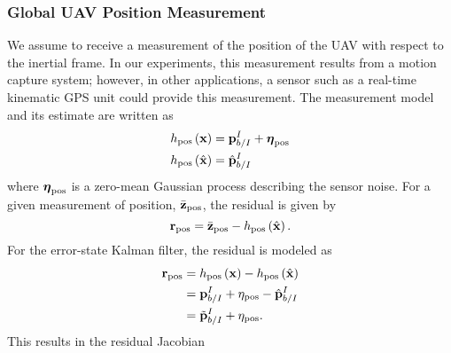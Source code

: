 \subsubsection{Global UAV Position Measurement}
We assume to receive a measurement of the position of the UAV with respect to
the inertial frame.
In our experiments, this measurement results from a motion capture system;
however, in other applications,
a sensor such as a real-time kinematic GPS unit could provide this measurement.
The measurement model and its estimate are
written as
\begin{align}
  h_{\text{pos}} \left( \boldsymbol{\mathrm{x}} \right) &= \boldsymbol{\mathrm{p}}_{b/I}^I +
  \boldsymbol{\mathrm{\eta}}_{\text{pos}} \\
  h_{\text{pos}} \left( \hat{\boldsymbol{\mathrm{x}}} \right) &= \hat{\boldsymbol{\mathrm{p}}}_{b/I}^I
\end{align}
where $\boldsymbol{\mathrm{\eta}}_{\text{pos}}$ is a zero-mean Gaussian process
describing the sensor noise.
For a given measurement of position, $\bar{\boldsymbol{\mathrm{z}}}_{\text{pos}}$, the residual is
given by
\begin{equation}
  \boldsymbol{\mathrm{r}}_{\text{pos}} = \bar{\boldsymbol{\mathrm{z}}}_{\text{pos}} - h_{\text{pos}} \left( \hat{\boldsymbol{\mathrm{x}}}
  \right).
\end{equation}
For the error-state Kalman filter, the residual is modeled as
\begin{align}
  \boldsymbol{\mathrm{r}}_{\text{pos}} &=  h_{\text{pos}} \left( \boldsymbol{\mathrm{x}} \right) - h_{\text{pos}} \left( \hat{\boldsymbol{\mathrm{x}}}
  \right) \\
                        &= \boldsymbol{\mathrm{p}}_{b/I}^I + \eta_{\text{pos}} -
                        \hat{\boldsymbol{\mathrm{p}}}_{b/I}^I \\
                        &= \tilde{\boldsymbol{\mathrm{p}}}_{b/I}^I + \eta_{\text{pos}}.
\end{align}
This results in the residual Jacobian
